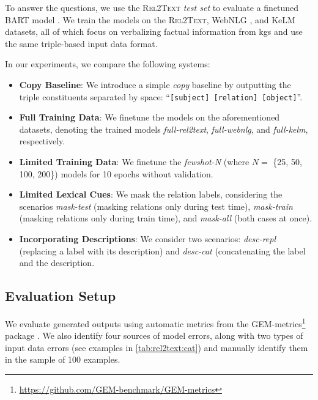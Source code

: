 \documentclass[12pt,notitlepage,a4paper,oneside,openany]{report}
\newcommand{\BARTr}{\textit{full-rel2text}}
\newcommand{\BARTk}{\textit{full-kelm}}
\newcommand{\BARTw}{\textit{full-webnlg}}
\renewcommand\cite{\citep}
\begin{document}
To answer the questions, we use the \textsc{Rel2Text} \emph{test set} to evaluate a finetuned BART model \cite{lewisBARTDenoisingSequencetoSequence2019}. We train the models on the \textsc{Rel2Text}, WebNLG \cite{ferreira20202020,gardentWebNLGChallengeGenerating2017}, and KeLM \cite{agarwalKnowledgeGraphBased2021} datasets, all of which focus on verbalizing factual information from \acp{kg} and use the same triple-based input data format.

In our experiments, we compare the following systems:
\begin{itemize}
    \item \textbf{Copy Baseline}: We introduce a simple \textit{copy} baseline by outputting the triple constituents separated by space: ``\texttt{[subject] [relation] [object]}''.

    \item \textbf{Full Training Data}: We finetune the models on the aforementioned datasets, denoting the trained models \BARTr{}, \BARTw{}, and \BARTk{}, respectively.

    \item \textbf{Limited Training Data}: We finetune the \textit{fewshot-N} (where $N=$ \{25, 50, 100, 200\}) models for 10 epochs without validation.

    \item \textbf{Limited Lexical Cues}: We mask the relation labels, considering the scenarios \textit{mask-test} (masking relations only during test time), \textit{mask-train} (masking relations only during train time), and \textit{mask-all} (both cases at once).

    \item \textbf{Incorporating Descriptions}: We consider two scenarios: \textit{desc-repl} (replacing a label with its description) and \textit{desc-cat} (concatenating the label and the description.
\end{itemize}

\subsection{Evaluation Setup}
\label{sec:rel2text:eval}

We evaluate generated outputs using automatic metrics from the GEM-metrics\footnote{\url{https://github.com/GEM-benchmark/GEM-metrics}} package \cite{gehrmannGEMBenchmarkNatural2021}. We also identify four sources of model errors, along with two types of input data errors (see examples in \autoref{tab:rel2text:cat}) and manually identify them in the sample of 100 examples.
\end{document}
